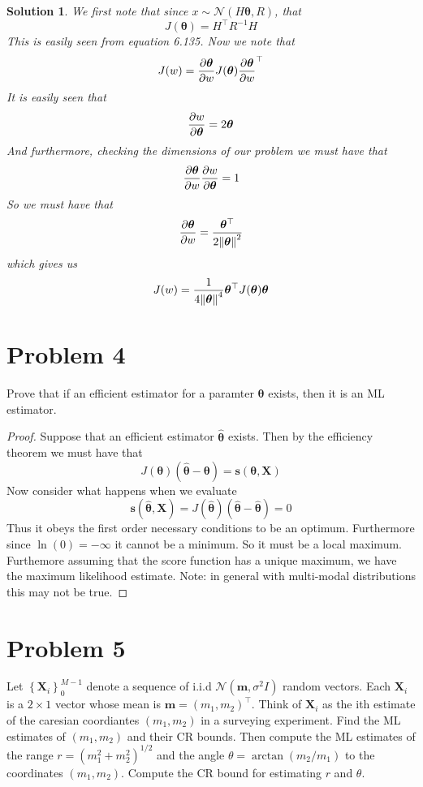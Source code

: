 \documentclass[a4paper]{article}
\newtheorem*{sol}{Solution}
\begin{document}
\begin{sol}
  We first note that since $x \sim \mathcal{N}(H \bm{\theta}, R)$, that
  \[
    J(\bm{\theta}) = H^\top R^{-1} H
  \]
  This is easily seen from equation 6.135. Now we note that
  \[
    J(w) = \pdv{\bm{\theta}}{w} J(\bm{\theta}) \pdv{\bm{\theta}}{w}^\top
  \]
  It is easily seen that
  \[
    \pdv{w}{\bm{\theta}} = 2 \bm{\theta}
  \]
  And furthermore, checking the dimensions of our problem we must have that
  \[
    \pdv{\bm{\theta}}{w} \pdv{w}{\bm{\theta}} = 1
  \]
  So we must have that
  \[
    \pdv{\bm{\theta}}{w} =  \frac{\bm{\theta}^\top}{2 \norm{\bm{\theta}}^2}
  \]
  which gives us
  \[
    J(w) = \frac{1}{4 \norm{\bm{\theta}}^4} \bm{\theta}^\top J(\bm{\theta}) \bm{\theta}
  \]
\end{sol}

\section*{Problem 4}%
Prove that if an efficient estimator for a paramter $\bm{\theta}$ exists, then it is an ML estimator.

\begin{proof}
  Suppose that an efficient estimator $\hat{\bm{\theta}}$ exists. Then by the efficiency theorem we must have that 
  \[
    J(\bm{\theta})(\hat{\bm{\theta}} - \bm{\theta}) = \bm{s}(\bm{\theta}, \bm{X})
  \]
  Now consider what happens when we evaluate
  \[
    \bm{s}(\hat{\bm{\theta}}, \bm{X}) = J(\hat{\bm{\theta}})(\hat{\bm{\theta}} - \hat{\bm{\theta}}) = 0
  \]
  Thus it obeys the first order necessary conditions to be an optimum. Furthermore since $\ln(0) = - \infty$ it cannot be a minimum. So it must be a local maximum. Furthemore assuming that the score function has a unique maximum, we have the maximum likelihood estimate. Note: in general with multi-modal distributions this may not be true.
\end{proof}

\section*{Problem 5}%
Let $\left\{ \bm{X}_i \right\}_0^{M-1}$ denote a sequence of i.i.d $\mathcal{N} \left( \bm{m}, \sigma^2 I \right)$ random vectors. Each $\bm{X}_i$ is a $2 \times 1$ vector whose mean is $\bm{m} = (m_1, m_2)^\top$. Think of $\bm{X}_i$ as the ith estimate of the caresian coordiantes $(m_1, m_2)$ in a surveying experiment. Find the ML estimates of $(m_1, m_2)$ and their CR bounds. Then compute the ML estimates of the range $r = (m_1^2 + m_2^2)^{1/2}$ and the angle $\theta = \arctan (m_2/m_1)$ to the coordinates $(m_1, m_2)$. Compute the CR bound for estimating $r$ and $\theta$.
\end{document}

